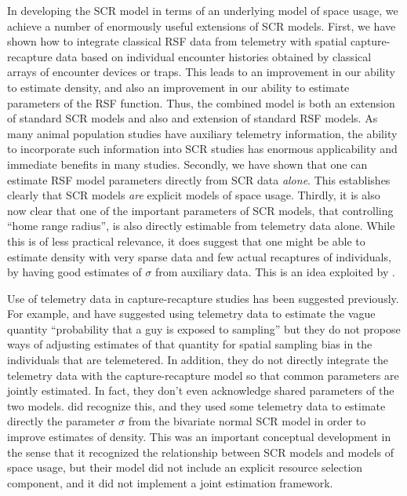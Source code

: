 In developing the SCR model in terms of an underlying model of space
usage, we achieve a number of enormously useful extensions of SCR
models. First, we have 
 shown how to integrate classical RSF data from telemetry
with spatial capture-recapture data based on individual encounter
histories obtained by classical arrays of encounter devices or
traps. This leads to an improvement in our ability to estimate
density, and also an improvement in our ability to estimate parameters
of the RSF function.  Thus, the combined model is both an extension of
standard SCR models and also and extension of standard RSF models. As
many animal population studies have auxiliary telemetry information,
the ability to incorporate such information into SCR studies has
enormous applicability and immediate benefits in many studies. 
Secondly, we have shown that one can estimate RSF model parameters
directly from SCR data {\it alone}. This establishes clearly that SCR
models {\it are} explicit models of space usage. Thirdly, it is also
now clear that one of the important parameters of SCR models, that
controlling ``home range radius'', is also directly estimable from
telemetry data alone. While this is of less practical relevance, it
does suggest that one might be able to estimate density with very
sparse data and few actual
recaptures of individuals, by having good estimates of $\sigma$ from
auxiliary data. This is an idea exploited by \citet{chandler_royle:2012}. 

Use of telemetry data in capture-recapture studies has been suggested
previously. For example, \citet{white_shenk:2001} and
\citet{ivan:2012} 
have suggested using telemetry data to estimate the vague quantity
``probability that a guy is exposed to sampling'' but they do not
propose ways of adjusting estimates of that quantity for spatial
sampling bias in the individuals that are telemetered. In addition,
they do not directly integrate the telemetry data with the
capture-recapture model so that common parameters are jointly
estimated. In fact, they don't even acknowledge shared parameters of
the two models. 
\citet{sollmann_etal:inprep} did recognize this, and they used some telemetry
data to estimate directly the parameter $\sigma$ from the bivariate normal
SCR model in 
order to improve estimates of density. This was an important conceptual
development in the sense that it recognized the relationship between SCR
models and models of space usage, but their model did not include an
explicit resource selection component, and it did not implement a joint estimation
framework.  

